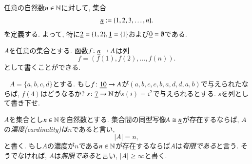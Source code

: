 
任意の自然数$n\in{\mathbb N}$に対して, 集合 
\begin{align}\label{dia:underline n}\index{a symbol!$\ul{n}$}
\ul{n}:=\{1,2,3,\ldots,n\}.
\end{align}
を定義する. よって, 特に$\underline{2}=\{1,2\}, \underline{1}=\{1\}$および$\underline{0}=\emptyset$である.


$A$を任意の集合とする. 函数$f\colon\underline{n}\rightarrow A$は列$$f=(f(1),f(2),\ldots,f(n)).$$として書くことができる.

\begin{exercise}\label{exc:sequence}~
\sexc $A=\{a,b,c,d\}$とする. もし$f\colon\underline{10}\rightarrow A$が$(a,b,c,c,b,a,d,d,a,b)$で与えられたならば, $f(4)$はどうなるか? 
\next $s\colon\underline{7}\rightarrow{\mathbb N}$が$s(i)=i^2$で与えられるとする. $s$を列として書き下せ.
\endsexc
\end{exercise}

\begin{definition}\label{def:cardinality}


$A$を集合とし$n\in{\mathbb N}$を自然数とする. 集合間の同型写像$A\cong\underline{n}$が存在するならば, $A$の\emph{濃度(cardinality)は$n$}であると言い, $$|A|=n,$$と書く. もし$A$の濃度が$n$である$n\in{\mathbb N}$が存在するならば$A$は\emph{有限である}と言う. そうでなければ, $A$は\emph{無限である}と言い, $|A|\geq\infty$と書く.

\end{definition}

